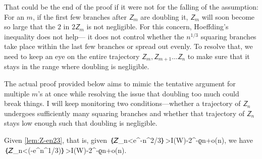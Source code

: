 \documentclass[openany]{amsbook}
\makeatletter
\numberwithin{equation}{chapter}
\numberwithin{figure}{chapter}
\numberwithin{table}{chapter}
\def\bigl@C#1{\bigl#1}					\def\bigr@C#1{\bigr#1}
\def\({\bigl@C(}	\def\){\bigr@C)}	令（{\Bigl(}			令）{\Bigr)}
\def\[#1\]{\begin{equation*}{#1}\end{equation*}}
\theoremstyle{definition}	理dfn:Definition~?s			理exa:Example~?s
\theoremstyle{remark}		理cla:Claim~?s				理rem:Remark~?s
\makeatother
\begin{document}
	That could be the end of the proof if it were not for the falling of the assumption:
	For an $m$, if the first few branches after $𝘡_m$ are doubling it,
	$𝘡_m$ will soon become so large that the $2$ in $2𝘡_m$ is not negligible.
	For this concern, Hoeffding's inequality does not help---%
	it does not control whether the $n^{1/3}$ squaring branches
	take place within the last few branches or spread out evenly.
	To resolve that, we need to keep an eye on the entire trajectory $𝘡_m,𝘡_{m+1}…𝘡_n$
	to make sure that it stays in the range where doubling is negligible.
	
	The actual proof provided below aims to mimic the tentative argument for multiple
	$m$'s at once while resolving the issue that doubling too much could break things.
	I will keep monitoring two conditions---whether a trajectory of $𝘡_n$
	undergoes sufficiently many squaring branches and whether
	that trajectory of $𝘡_n$ stays low enough such that doubling is negligible.
	
	\begin{lem}\label{lem:Z-een13}
		Given \cref{lem:Z-en23}, that is, given
		\[𝘗｛𝘡_n<e^{-n^{2/3}}｝>I(W)-2^{-ϱn+o(n)},\]
		we have
		\[𝘗｛𝘡_n<\exp\(-e^{n^{1/3}}\)｝>I(W)-2^{-ϱn+o(n)}.\label{ine:Z-een13}\]
	\end{lem}
	
\end{document}
